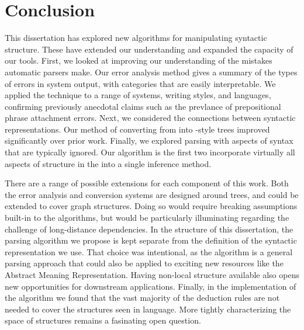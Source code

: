 \chapter{Conclusion}

This dissertation has explored new algorithms for manipulating syntactic structure.
These have extended our understanding and expanded the capacity of our tools.
First, we looked at improving our understanding of the mistakes automatic parsers make.
Our error analysis method gives a summary of the types of errors in system output, with categories that are easily interpretable.
We applied the technique to a range of systems, writing styles, and languages, confirming previously anecdotal claims such as the prevlance of prepositional phrase attachment errors.
Next, we considered the connections between syntactic representations.
Our method of converting from \ccg into \ptb-style trees improved significantly over prior work.
Finally, we explored parsing with aspects of syntax that are typically ignored.
Our algorithm is the first two incorporate virtually all aspects of structure in the \ptb into a single inference method.

There are a range of possible extensions for each component of this work.
Both the error analysis and conversion systems are designed around trees, and could be extended to cover graph structures.
Doing so would require breaking assumptions built-in to the algorithms, but would be particularly illuminating regarding the challenge of long-distance dependencies.
In the structure of this dissertation, the parsing algorithm we propose is kept separate from the definition of the syntactic representation we use.
That choice was intentional, as the algorithm is a general parsing approach that could also be applied to exciting new resources like the Abstract Meaning Representation.
Having non-local structure available also opens new opportunities for downstream applications.
Finally, in the implementation of the algorithm we found that the vast majority of the deduction rules are not needed to cover the structures seen in language.
More tightly characterizing the space of structures remains a fasinating open question.
